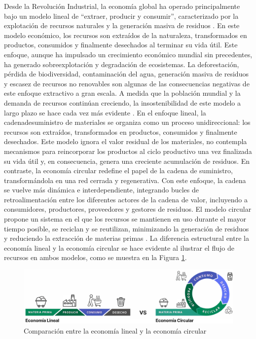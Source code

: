 Desde la Revolución Industrial, la economía global ha operado principalmente bajo un modelo lineal de ``extraer, producir y consumir'', caracterizado por la explotación de recursos naturales y la generación masiva de residuos \cite{cerda2016economia}. En este modelo económico, los recursos son extraídos de la naturaleza, transformados en productos, consumidos y finalmente desechados al terminar su vida útil. Este enfoque, aunque ha impulsado un crecimiento económico mundial sin precedentes, ha generado sobreexplotación y degradación de ecosistemas. La deforestación, pérdida de biodiversidad, contaminación del agua, generación masiva de residuos y escasez de recursos no renovables son algunas de las consecuencias negativas de este enfoque extractivo a gran escala. A medida que la población mundial y la demanda de recursos continúan creciendo, la insostenibilidad de este modelo a largo plazo se hace cada vez más evidente \cite{clima2022book}. En el enfoque lineal, la \gls{cadenadesuministro} de materiales se organiza como un proceso unidireccional: los recursos son extraídos, transformados en productos, consumidos y finalmente desechados. Este modelo ignora el valor residual de los materiales, no contempla mecanismos para reincorporar los productos al ciclo productivo una vez finalizada su vida útil y, en consecuencia, genera una creciente acumulación de residuos. En contraste, la economía circular redefine el papel de la cadena de suministro, transformándola en una red cerrada y regenerativa. Con este enfoque, la cadena se vuelve más dinámica e interdependiente, integrando bucles de retroalimentación entre los diferentes actores de la cadena de valor, incluyendo a consumidores, productores, proveedores y gestores de residuos. El modelo circular propone un sistema en el que los recursos se mantienen en uso durante el mayor tiempo posible, se reciclan y se reutilizan, minimizando la generación de residuos y reduciendo la extracción de materias primas \cite{ellenmacarthurfoundation2022}. La diferencia estructural entre la economía lineal y la economía circular se hace evidente al ilustrar el flujo de recursos en ambos modelos, como se muestra en la Figura \ref{fig:circular-linear-economy-comparison}.

\begin{figure}[!tb]
    \centering
    \includegraphics[width=\textwidth]{Figures/circular-linear-economy-comparison.png}
    \caption{Comparación entre la economía lineal y la economía circular}
    \label{fig:circular-linear-economy-comparison}
\end{figure}

